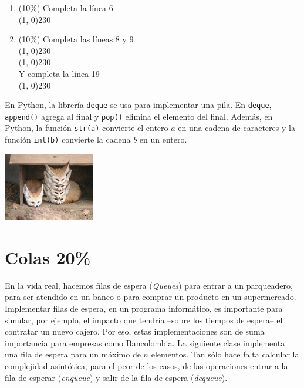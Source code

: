 \documentclass[10 pt]{article}
\begin{document}
\begin{enumerate}[label=(\Alph*)]
 
  \item (10\%) Completa la línea 6\\
  \line(1, 0){230}\\
  \item (10\%) Completa las líneas 8 y 9\\
  \line(1, 0){230} \\
  \line(1, 0){230}\\
  Y completa la línea 19\\
  \line(1, 0){230}
\end{enumerate}

En Python, la librería \texttt{deque} se usa para implementar una pila. 
En \texttt{deque}, \texttt{append()} agrega al final y \texttt{pop()} elimina el elemento del final. 
Además, en Python, la función \texttt{str(a)} convierte el entero $a$ en una cadena de caracteres y la función \texttt{int(b)} convierte la cadena $b$ en un entero.


\begin{center}
\includegraphics[width=0.3\textwidth]{stack.jpg}
\end{center}

\newpage





\section{Colas 20\%}


En la vida real,  hacemos filas de espera (\textit{Queues}) para entrar a un parqueadero, para ser atendido en un banco o para comprar un producto en un supermercado.
 Implementar filas de espera, en un programa informático, es importante para simular, por ejemplo, el impacto que tendría
 --sobre los tiempos de espera-- el contratar un nuevo cajero. Por eso, estas implementaciones son de suma importancia para empresas como Bancolombia. 
La siguiente clase implementa una fila de espera para un máximo de $n$ elementos. Tan sólo hace falta calcular la complejidad asintótica, para el peor de los
casos, de las operaciones entrar a la fila de esperar (\textit{enqueue}) y salir de la fila de espera (\textit{dequeue}). 
\end{document}
